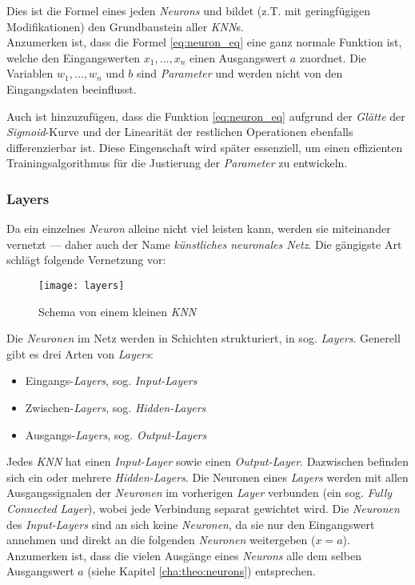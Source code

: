 Dies ist die Formel eines jeden \textit{Neurons} und bildet (z.T. mit geringfügigen Modifikationen) den Grundbaustein aller \textit{KNN}s.\\

Anzumerken ist, dass die Formel \ref{eq:neuron_eq} eine ganz normale Funktion ist, welche den Eingangswerten $x_1,...,x_n$ einen Ausgangswert $a$ zuordnet. Die Variablen $w_1,...,w_n$ und $b$ sind \textit{Parameter} und werden nicht von den Eingangsdaten beeinflusst.

Auch ist hinzuzufügen, dass die Funktion \ref{eq:neuron_eq} aufgrund der \textit{Glätte} der \textit{Sigmoid}-Kurve und der Linearität der restlichen Operationen ebenfalls differenzierbar ist. Diese Eingenschaft wird später essenziell, um einen effizienten Trainingsalgorithmus für die Justierung der \textit{Parameter} zu entwickeln.

\newpage

\subsubsection{Layers}\label{cha:theo:layers}

Da ein einzelnes \textit{Neuron} alleine nicht viel leisten kann, werden sie miteinander vernetzt --- daher auch der Name \textit{künstliches neuronales Netz}. Die gängigste Art schlägt folgende Vernetzung vor:

\begin{figure}[h]
	\centering
	\texttt{[image: layers]}
	\caption[Schema von kleinem \textit{KNN}]{Schema von einem kleinen \textit{KNN}}
	\label{img:layers}
\end{figure}

Die \textit{Neuronen} im Netz werden in Schichten strukturiert, in sog. \textit{Layers}\footnotemark. Generell gibt es drei Arten von \textit{Layers}:


\begin{itemize}
	\item Eingangs-\textit{Layers}, sog. \textit{Input-Layers}
	\item Zwischen-\textit{Layers}, sog. \textit{Hidden-Layers}
	\item Ausgangs-\textit{Layers}, sog. \textit{Output-Layers}
\end{itemize}
Jedes \textit{KNN} hat einen \textit{Input-Layer} sowie einen \textit{Output-Layer}. Dazwischen befinden sich ein oder mehrere \textit{Hidden-Layers}. Die Neuronen eines \textit{Layers} werden mit allen Ausgangssignalen der \textit{Neuronen} im vorherigen \textit{Layer} verbunden (ein sog. \textit{Fully Connected Layer}), wobei jede Verbindung separat gewichtet wird. Die \textit{Neuronen} des \textit{Input-Layers} sind an sich keine \textit{Neuronen}, da sie nur den Eingangswert annehmen und direkt an die folgenden \textit{Neuronen} weitergeben ($x = a$). Anzumerken ist, dass die vielen Ausgänge eines \textit{Neurons} alle dem selben Ausgangswert $a$ (siehe Kapitel \ref{cha:theo:neurons}) entsprechen. 

